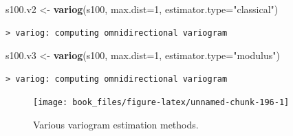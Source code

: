 \documentclass[b5paper,]{scrbook}
\makeatletter
\newenvironment{Shaded}{\begin{snugshade}}{\end{snugshade}}
\newcommand{\KeywordTok}[1]{\textcolor[rgb]{0.13,0.29,0.53}{\textbf{{#1}}}}
\newcommand{\DataTypeTok}[1]{\textcolor[rgb]{0.13,0.29,0.53}{{#1}}}
\newcommand{\DecValTok}[1]{\textcolor[rgb]{0.00,0.00,0.81}{{#1}}}
\newcommand{\StringTok}[1]{\textcolor[rgb]{0.31,0.60,0.02}{{#1}}}
\newcommand{\NormalTok}[1]{{#1}}
\theoremstyle{plain}
\theoremstyle{definition}
\numberwithin{equation}{section}
\newenvironment{kframe}{%
\medskip{}
\setlength{\fboxsep}{.8em}
 \def\at@end@of@kframe{}%
 \ifinner\ifhmode%
  \def\at@end@of@kframe{\end{minipage}}%
  \begin{minipage}{\columnwidth}%
 \fi\fi%
 \def\FrameCommand##1{\hskip\@totalleftmargin \hskip-\fboxsep
 \colorbox{shadecolor}{##1}\hskip-\fboxsep
     \hskip-\linewidth \hskip-\@totalleftmargin \hskip\columnwidth}%
 \MakeFramed {\advance\hsize-\width
   \@totalleftmargin\z@ \linewidth\hsize
   \@setminipage}}%
 {\par\unskip\endMakeFramed%
 \at@end@of@kframe}
\renewenvironment{Shaded}{\begin{kframe}}{\end{kframe}}
\makeatother
\begin{document}
\begin{Shaded}
\begin{Highlighting}[]
\NormalTok{s100.v2 <-}\StringTok{ }\KeywordTok{variog}\NormalTok{(s100, }\DataTypeTok{max.dist=}\DecValTok{1}\NormalTok{, }\DataTypeTok{estimator.type=}\StringTok{"classical"}\NormalTok{)}
\end{Highlighting}
\end{Shaded}

\begin{verbatim}
> variog: computing omnidirectional variogram
\end{verbatim}

\begin{Shaded}
\begin{Highlighting}[]
\NormalTok{s100.v3 <-}\StringTok{ }\KeywordTok{variog}\NormalTok{(s100, }\DataTypeTok{max.dist=}\DecValTok{1}\NormalTok{, }\DataTypeTok{estimator.type=}\StringTok{"modulus"}\NormalTok{)}
\end{Highlighting}
\end{Shaded}

\begin{verbatim}
> variog: computing omnidirectional variogram
\end{verbatim}

\begin{Shaded}
\end{Shaded}

\begin{figure}

{\centering \texttt{[image: book\_files/figure-latex/unnamed-chunk-196-1]} 

}

\caption{Various variogram estimation methods.}\label{fig:unnamed-chunk-196}
\end{figure}
\end{document}
